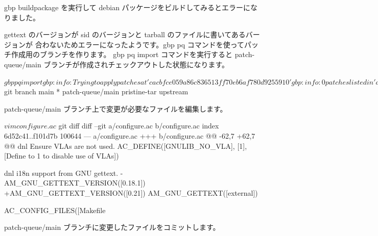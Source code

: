 \documentclass[mingoth,a4paper]{jsarticle}
\begin{document}
gbp buildpackage を実行して debian パッケージをビルドしてみるとエラーになりました。


gettext のバージョンが sid のバージョンと tarball のファイルに書いてあるバージョンが
合わないためエラーになったようです。gbp pq コマンドを使ってパッチ作成用のブランチを作ります。
gbp pq import コマンドを実行すると patch-queue/main ブランチが作成されチェックアウトした状態になります。

\begin{commandline}
$ gbp pq import
gbp:info: Trying to apply patches at 'cacbfce059a86c836513ff70eb6af780d9255910'
gbp:info: 0 patches listed in 'debian/patches/series' imported on 'patch-queue/main'

$ git branch
  main
* patch-queue/main
  pristine-tar
  upstream
\end{commandline}

patch-queue/main ブランチ上で変更が必要なファイルを編集します。

\begin{commandline}
$ vim configure.ac
$ git diff
diff --git a/configure.ac b/configure.ac
index 6d52c41..f101d7b 100644
--- a/configure.ac
+++ b/configure.ac
@@ -62,7 +62,7 @@ dnl Ensure VLAs are not used.
 AC_DEFINE([GNULIB_NO_VLA], [1], [Define to 1 to disable use of VLAs])

 dnl i18n support from GNU gettext.
-AM_GNU_GETTEXT_VERSION([0.18.1])
+AM_GNU_GETTEXT_VERSION([0.21])
 AM_GNU_GETTEXT([external])

 AC_CONFIG_FILES([Makefile
\end{commandline}

patch-queue/main ブランチに変更したファイルをコミットします。
\end{document}
